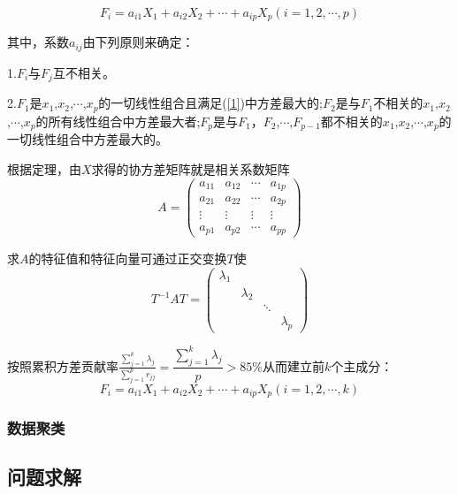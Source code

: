 \documentclass[bwprint]{gmcmthesis}
\begin{document}
\begin{equation}
\mathit{F}_i=a_{i1}\mathit{X}_1+a_{i2}\mathit{X}_2+\cdots+a_{ip}\mathit{X}_p(i=1,2,\cdots,p)
\label{1} 
\end{equation}

其中，系数$a_{ij}$由下列原则来确定：

1.$\mathit{F}_i$与$\mathit{F}_j$互不相关。

2.$\mathit{F}_1$是$x_1$,$x_2$,$\cdots$,$x_p$的一切线性组合且满足(\ref{1})中方差最大的;$\mathit{F}_2$是与$\mathit{F}_1$不相关的$x_1$,$x_2$,$\cdots$,$x_p$的所有线性组合中方差最大者;$\mathit{F}_p$是与$\mathit{F}_1$，$\mathit{F}_2$,$\cdots$,$\mathit{F}_{p-1}$都不相关的$x_1$,$x_2$,$\cdots$,$x_p$的一切线性组合中方差最大的。


根据定理，由$\mathit{X}$求得的协方差矩阵就是相关系数矩阵
\begin{equation}
	\mathit{A}=\left(\begin{matrix}
	a_{11} & a_{12} & \cdots & a_{1p} \\ 
	a_{21} & a_{22} & \cdots & a_{2p} \\ 
	\vdots & \vdots & \vdots & \vdots \\ 
	a_{p1} & a_{p2} & \cdots & a_{pp}
	\end{matrix} \right) 
\end{equation}

求$A$的特征值和特征向量可通过正交变换$T$使
\begin{equation}
	T^{-1}AT=\left(\begin{matrix}
	\lambda_1 &  &  &  \\ 
	& \lambda_2 &  &  \\ 
	&  & \ddots &  \\ 
	&  &  & \lambda_p
	\end{matrix}  \right) 
\end{equation}

按照累积方差贡献率$\frac{\sum_{j=1}^k\lambda_j}{\sum_{j=1}^pr_{jj}}= \dfrac{\sum_{j=1}^k\lambda_j}{p}>85\%$从而建立前$k$个主成分：
\begin{equation}
\mathit{F}_i=a_{i1}\mathit{X}_1+a_{i2}\mathit{X}_2+\cdots+a_{ip}\mathit{X}_p(i=1,2,\cdots,k)
\end{equation}

\subsubsection{数据聚类}

\subsection{问题求解}
\end{document}
